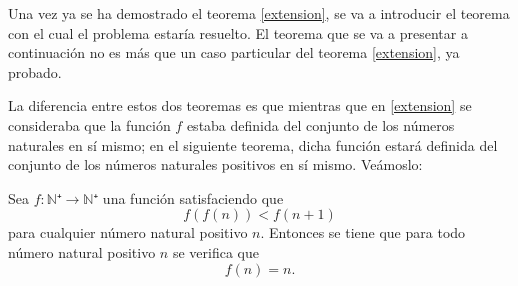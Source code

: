 Una vez ya se ha demostrado el teorema \ref{extension}, se va a
introducir el teorema con el cual el problema estaría resuelto. El
teorema que se va a presentar a continuación no es más que un caso
particular del teorema \ref{extension}, ya probado.

La diferencia entre estos dos teoremas es que mientras que en
\ref{extension} se consideraba que la función \(f\) estaba definida
del conjunto de los números naturales en sí mismo; en el siguiente
teorema, dicha función estará definida del conjunto de los números
naturales positivos en sí mismo. Veámoslo:

\begin{teorema}[imo1977\(\_ \)q6]
  Sea \(f:ℕ⁺ → ℕ⁺\) una función satisfaciendo que
  \begin{equation}
    f(f(n))<f(n+1)
  \end{equation}
  para cualquier número natural positivo \(n\). Entonces se tiene
  que para todo número natural positivo \(n\) se verifica que
  \begin{equation}\label{objf}
    f(n)=n.
  \end{equation}
\end{teorema}
